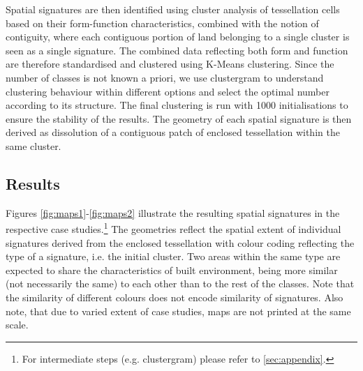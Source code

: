 
Spatial signatures are then identified using cluster analysis of tessellation cells
based on their form-function characteristics, combined with the notion of contiguity,
where each contiguous portion of land belonging to a single cluster is seen as a single
signature.
The combined data reflecting both form and function are therefore standardised and
clustered using K-Means clustering. Since the number of classes is not known a priori,
we use clustergram \citep{schonlau2002clustergram} to understand clustering behaviour
within different options and select the optimal number according to its structure.
The final clustering is run with 1000 initialisations to ensure the stability of the
results.
The geometry of each spatial signature is then derived as dissolution of a contiguous
patch of enclosed tessellation within the same cluster.


\subsection{Results}

Figures \ref{fig:maps1}-\ref{fig:maps2} illustrate the resulting spatial signatures in the respective case
studies.\footnote{For intermediate steps (e.g. clustergram) please refer to
\ref{sec:appendix}.} The geometries reflect the spatial extent of individual signatures
derived from the enclosed tessellation
with colour coding reflecting the type of a signature, i.e. the initial cluster. Two
areas within the same type are expected to share the characteristics of built
environment, being more similar (not necessarily the same) to each other than to the
rest of the classes. Note that the similarity of different colours does not encode
similarity of signatures. Also note, that due to varied extent of case studies, maps are
not printed at the same scale.

